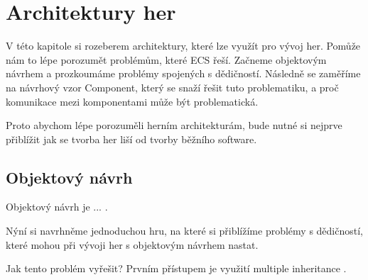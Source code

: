 
\chapter{Architektury her}
V této kapitole si rozeberem architektury, které lze využít pro vývoj her. Pomůže nám to lépe porozumět problémům, které ECS řeší. Začneme objektovým návrhem a prozkoumáme problémy spojených s dědičností. Následně se zaměříme na návrhový vzor Component, který se snaží řešit tuto problematiku, a proč komunikace mezi komponentami může být problematická.

Proto abychom lépe porozuměli herním architekturám, bude nutné si nejprve přiblížit jak se tvorba her liší od tvorby běžního software.


\section{Objektový návrh}
Objektový návrh je ... .

Nýní si navrhněme jednoduchou hru, na které si přiblížíme problémy s dědičností, které mohou při vývoji her s objektovým návrhem nastat.

Jak tento problém vyřešit? Prvním přístupem je využití multiple inheritance .

